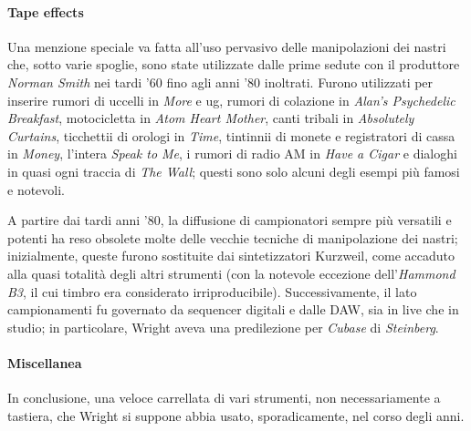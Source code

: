 \documentclass[class=book, crop=false, oneside, 12pt]{standalone}
\begin{document}
    \paragraph{Tape effects}
    Una menzione speciale va fatta all'uso pervasivo delle manipolazioni dei nastri che, sotto varie spoglie, sono state utilizzate dalle prime sedute con il produttore \emph{Norman Smith} nei tardi '60 fino agli anni '80 inoltrati. Furono utilizzati per inserire rumori di uccelli in \emph{More} e \acrshort{ug}, rumori di colazione in \emph{Alan's Psychedelic Breakfast}, motocicletta in \emph{Atom Heart Mother}, canti tribali in \emph{Absolutely Curtains}, ticchettii di orologi in \emph{Time}, tintinnii di monete e registratori di cassa in \emph{Money}, l'intera \emph{Speak to Me}, i rumori di radio AM in \emph{Have a Cigar} e dialoghi in quasi ogni traccia di \emph{The Wall}; questi sono solo alcuni degli esempi più famosi e notevoli. 
    
    A partire dai tardi anni '80, la diffusione di campionatori sempre più versatili e potenti ha reso obsolete molte delle vecchie tecniche di manipolazione dei nastri; inizialmente, queste furono sostituite dai sintetizzatori Kurzweil, come accaduto alla quasi totalità degli altri strumenti (con la notevole eccezione dell'\emph{Hammond B3}, il cui timbro era considerato irriproducibile). Successivamente, il lato campionamenti fu governato da sequencer digitali e dalle DAW, sia in live che in studio; in particolare, Wright aveva una predilezione per \emph{Cubase} di \emph{Steinberg}.
    
    \paragraph{Miscellanea} In conclusione, una veloce carrellata di vari strumenti, non necessariamente a tastiera, che Wright si suppone abbia usato, sporadicamente, nel corso degli anni.
\end{document}
